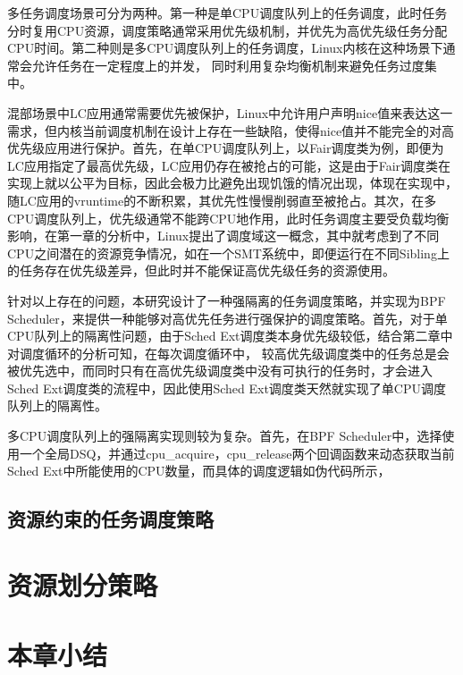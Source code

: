 多任务调度场景可分为两种。第一种是单CPU调度队列上的任务调度，此时任务分时复用CPU资源，调度策略通常采用优先级机制，并优先为高优先级任务分配CPU时间。第二种则是多CPU调度队列上的任务调度，Linux内核在这种场景下通常会允许任务在一定程度上的并发， 同时利用复杂均衡机制来避免任务过度集中。

混部场景中LC应用通常需要优先被保护，Linux中允许用户声明nice值来表达这一需求，但内核当前调度机制在设计上存在一些缺陷，使得nice值并不能完全的对高优先级应用进行保护。首先，在单CPU调度队列上，以Fair调度类为例，即便为LC应用指定了最高优先级，LC应用仍存在被抢占的可能，这是由于Fair调度类在实现上就以公平为目标，因此会极力比避免出现饥饿的情况出现，体现在实现中，随LC应用的vruntime的不断积累，其优先性慢慢削弱直至被抢占。其次，在多CPU调度队列上，优先级通常不能跨CPU地作用，此时任务调度主要受负载均衡影响，在第一章的分析中，Linux提出了调度域这一概念，其中就考虑到了不同CPU之间潜在的资源竞争情况，如在一个SMT系统中，即便运行在不同Sibling上的任务存在优先级差异，但此时并不能保证高优先级任务的资源使用。

针对以上存在的问题，本研究设计了一种强隔离的任务调度策略，并实现为BPF Scheduler，来提供一种能够对高优先任务进行强保护的调度策略。首先，对于单CPU队列上的隔离性问题，由于Sched Ext调度类本身优先级较低，结合第二章中对调度循环的分析可知，在每次调度循环中， 较高优先级调度类中的任务总是会被优先选中，而同时只有在高优先级调度类中没有可执行的任务时，才会进入Sched Ext调度类的流程中，因此使用Sched Ext调度类天然就实现了单CPU调度队列上的隔离性。

多CPU调度队列上的强隔离实现则较为复杂。首先，在BPF Scheduler中，选择使用一个全局DSQ，并通过cpu\_acquire，cpu\_release两个回调函数来动态获取当前Sched Ext中所能使用的CPU数量，而具体的调度逻辑如伪代码所示，

\subsection{资源约束的任务调度策略}


\section{资源划分策略}

\section{本章小结}